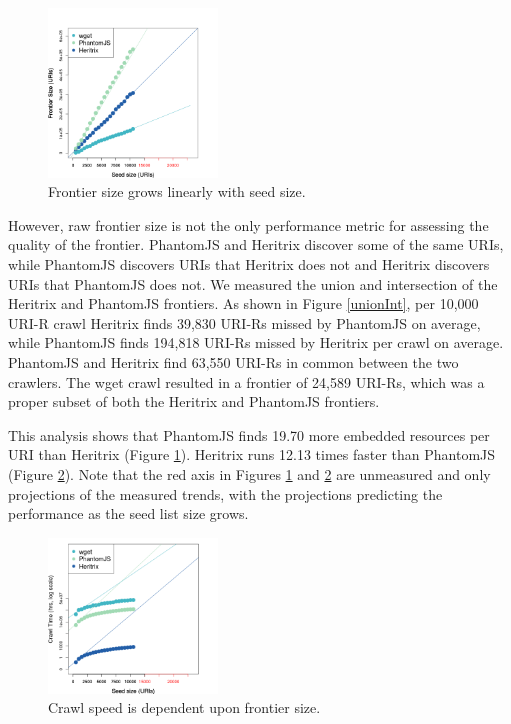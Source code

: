 \documentclass{ipres_proc_article-sp}
\begin{document}
\begin{figure}
 \begin{center}
    \includegraphics[width=0.4\textwidth,keepaspectratio]{./imgs/predictGrowthFunction2.png}
  \end{center}
  \caption{Frontier size grows linearly with seed size.}
  \label{frontierGrowth}
\end{figure}

However, raw frontier size is not the only performance metric for assessing the quality of the frontier. PhantomJS and Heritrix discover some of the same URIs, while PhantomJS discovers URIs that Heritrix does not and Heritrix discovers URIs that PhantomJS does not. We measured the union and intersection of the Heritrix and PhantomJS frontiers. As shown in Figure \ref{unionInt}, per 10,000 URI-R crawl Heritrix finds 39,830 URI-Rs missed by PhantomJS on average, while PhantomJS finds 194,818 URI-Rs missed by Heritrix per crawl on average. PhantomJS and Heritrix find 63,550 URI-Rs in common between the two crawlers. The wget crawl resulted in a frontier of 24,589 URI-Rs, which was a proper subset of both the Heritrix and PhantomJS frontiers.


This analysis shows that PhantomJS finds 19.70 more embedded resources per URI than Heritrix (Figure \ref{frontierGrowth}). Heritrix runs 12.13 times faster than PhantomJS (Figure \ref{speedGrowth}). Note that the red axis in Figures \ref{frontierGrowth} and \ref{speedGrowth} are unmeasured and only projections of the measured trends, with the projections predicting the performance as the seed list size grows.%


\begin{figure}[t]
 \begin{center}
    \includegraphics[width=0.4\textwidth,keepaspectratio]{./imgs/predictGrowthFunctionTime2.png}
  \end{center}
  \caption{Crawl speed is dependent upon frontier size.}
  \label{speedGrowth}
\end{figure}
\vskip -3mm
\end{document}
